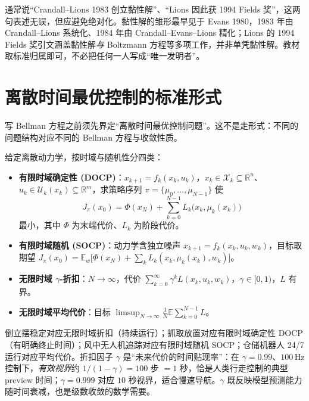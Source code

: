 \begin{remark}[史实小注]
通常说“Crandall--Lions 1983 创立黏性解”、“Lions 因此获 1994 Fields 奖”，这两句表述无误，但应避免绝对化。黏性解的雏形最早见于 Evans 1980，1983 年由 Crandall--Lions 系统化、1984 年由 Crandall--Evans--Lions 精化\cite{evans1984differential}；Lions 的 1994 Fields 奖引文涵盖黏性解\emph{与} Boltzmann 方程等多项工作，并非单凭黏性解。教材取标准归属即可，不必把任何一人写成“唯一发明者”。
\end{remark}

\section{离散时间最优控制的标准形式}
\label{sec:dp-docp}

写 Bellman 方程之前须先界定“离散时间最优控制问题”。这不是走形式：不同的问题结构对应不同的 Bellman 方程与收敛性质。

\begin{definition}[四类标准问题]\label{def:dp-docp}
给定离散动力学，按时域与随机性分四类：
\begin{itemize}
  \item \textbf{有限时域确定性 (DOCP)}：$x_{k+1}=f_k(x_k,u_k)$，$x_k\in\mathcal X_k\subseteq\mathbb R^n$、$u_k\in\mathcal U_k(x_k)\subseteq\mathbb R^m$，求策略序列 $\pi=\{\mu_0,\dots,\mu_{N-1}\}$ 使
  \begin{equation}
    J_\pi(x_0)=\Phi(x_N)+\sum_{k=0}^{N-1}L_k\big(x_k,\mu_k(x_k)\big)
    \label{eq:dp-docp-cost}
  \end{equation}
  最小，其中 $\Phi$ 为末端代价、$L_k$ 为阶段代价。
  \item \textbf{有限时域随机 (SOCP)}：动力学含独立噪声 $x_{k+1}=f_k(x_k,u_k,w_k)$，目标取期望 $J_\pi(x_0)=\mathbb E_{w}\!\big[\Phi(x_N)+\sum_k L_k(x_k,\mu_k(x_k),w_k)\big]$。
  \item \textbf{无限时域 $\gamma$-折扣}：$N\to\infty$，代价 $\sum_{k=0}^\infty\gamma^k L(x_k,u_k,w_k)$，$\gamma\in[0,1)$，$L$ 有界。
  \item \textbf{无限时域平均代价}：目标 $\limsup_{N\to\infty}\tfrac1N\mathbb E\sum_{k=0}^{N-1}L$。
\end{itemize}
\end{definition}

倒立摆稳定对应无限时域折扣（持续运行）；抓取放置对应有限时域确定性 DOCP（有明确终止时间）；风中无人机追踪对应有限时域随机 SOCP；仓储机器人 24/7 运行对应平均代价。折扣因子 $\gamma$ 是“未来代价的时间贴现率”：在 $\gamma=0.99$、$100$\,Hz 控制下，\emph{有效视界}约 $1/(1-\gamma)=100$ 步 $=1$ 秒，恰是人类行走控制的典型 preview 时间；$\gamma=0.999$ 对应 $10$ 秒视界，适合慢速导航。$\gamma$ 既反映模型预测能力随时间衰减，也是级数收敛的数学需要。

